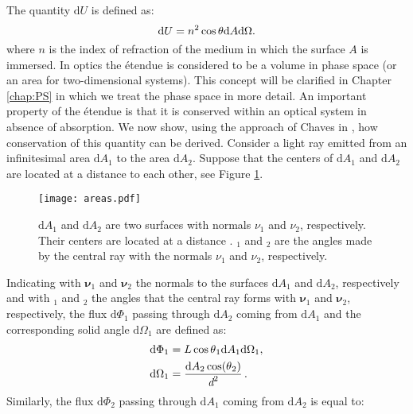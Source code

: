 The quantity $ \textrm{d}U $ is defined as:
\begin{equation}\label{etendue}
\textrm{d}U = n^2 \cos\mbox{$\theta$}\textrm{d}A\textrm{d}\Omega.
\end{equation}
where $n$ is the index of refraction of the medium in which the surface $A$ is immersed. In optics the \'{e}tendue is considered to be a volume in phase space  (or an area for two-dimensional systems). This concept will be clarified in Chapter \ref{chap:PS} in which we treat the phase space in more detail.
An important property of the \'{e}tendue is that it is conserved within an optical system in absence of absorption. We now show, using the approach of Chaves in \cite{chaves2015introduction}, 
how conservation of this quantity can be derived.
Consider a light ray emitted from an infinitesimal area $\textrm{d}A_1$ to the area $\textrm{d}A_2$. Suppose that the centers of $\textrm{d}A_1$ and $\textrm{d}A_2$ 
are located at a distance  to each other,  see Figure \ref{fig:etendue_conservation}.
\begin{figure}[h]
 \label{fig:etendue_conservation}
     \begin{center}
     \texttt{[image: areas.pdf]}
     \end{center}
     \caption{\footnotesize{$\textrm{d}A_1$ and $\textrm{d}A_2$ are two surfaces with normals $\nu_1$ and $\nu_2$, respectively. Their centers are located at a distance .
\myangle$_1$ and \myangle$_2$ are the angles made by the central ray with the normals $\nu_1$ and $\nu_2$, respectively.}}
\label{fig:etendue_conservation}
 \end{figure}
Indicating with $\boldsymbol{\nu}_1$ and $\boldsymbol{\nu}_2$ the normals to the surfaces $\textrm{d}A_1$ and $\textrm{d}A_2$, respectively and with \myangle$_1$ and \myangle$_2$ the angles that the central ray forms with $\boldsymbol{\nu}_1$ and $\boldsymbol{\nu}_2$, respectively,
the flux $\textrm{d}\Phi_1$ passing through $\textrm{d}A_2$ coming from $\textrm{d}A_1$ and the corresponding solid angle $\textrm{d}\Omega_1 $ are defined as:
\begin{equation}
\begin{split}
\textrm{d}\Phi_1 &= L \cos\mbox{$\theta$}_1 \textrm{d}A_1 \textrm{d}\Omega_1, \\
\textrm{d}\Omega_1 &= \frac{\textrm{d}A_2\cos(\mbox{$\theta$}_2)}{\textit{d}^2}\,.
\end{split}
\end{equation}
Similarly, the flux $\textrm{d}\Phi_2$ passing through $\textrm{d}A_1$ coming from $\textrm{d}A_2$ is equal to:
